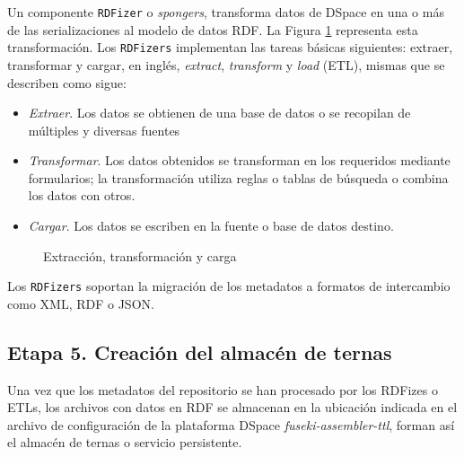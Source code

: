 Un componente \texttt{RDFizer} \cite{RDFizer} o \textit{spongers}, transforma datos de DSpace en una o m\'as de las serializaciones al modelo de datos RDF. La Figura \ref{etl-diagrama} representa esta transformaci\'on. Los \texttt{RDFizers} implementan  las tareas b\'asicas siguientes: extraer, transformar y cargar, en ingl\'es, \emph{extract}, \emph{transform} y \emph{load} (ETL), mismas que se describen como sigue: 

\begin{itemize}
    \item \textit{Extraer}. Los datos se obtienen de una base de datos o se recopilan de m\'ultiples y diversas fuentes 
    
    \item \textit{Transformar}. Los datos obtenidos se transforman en los requeridos mediante formularios; la transformaci\'on utiliza reglas o tablas de b\'usqueda o combina los datos con otros.
    
    \item \textit{Cargar}. Los datos se escriben en la fuente o base de datos destino. 
\end{itemize}

\begin{figure}[!ht]
	\centering
    \caption{Extracci\'on, transformaci\'on y carga}
    \label{etl-diagrama}
\end{figure}

Los \texttt{RDFizers} soportan la migraci\'on de los metadatos a formatos de intercambio como XML, RDF o JSON. 

\subsection{Etapa 5. Creaci\'on del almac\'en de ternas}

Una vez que los metadatos del repositorio se han procesado por los RDFizes o ETLs, los archivos con datos en RDF se almacenan en la ubicaci\'on indicada en el archivo de configuraci\'on de la plataforma DSpace \textit{fuseki-assembler-ttl}, forman as\'i el almac\'en de ternas o servicio persistente.

